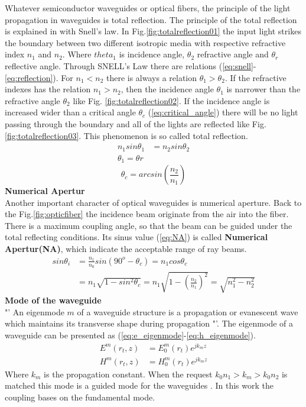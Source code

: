 Whatever semiconductor waveguides or optical fibers, the principle of the light propagation in waveguides is total reflection. The principle of the total reflection is explained in \cite{optical_waveguides_fibers} with Snell's law. In Fig.\ref{fig:totalreflection01} the input light strikes the boundary between two different isotropic media with respective refractive index $n_{1}$ and $n_{2}$. Where $theta_{1}$ is incidence angle, $\theta_{2}$ refractive angle and $\theta_{r}$ reflective angle. Through SNELL's Law there are relations (\ref{eq:snell}-\ref{eq:reflection}).  For $n_{1}<n_{2}$ there is  always a relation $\theta_{1}>\theta_{2}$.  If the refractive indexes has the relation $n_{1}>n_{2}$, then the incidence angle $\theta_{1}$ is narrower than the refractive angle $\theta_{2}$ like Fig. \ref{fig:totalreflection02}. If the incidence angle is increased wider than a critical angle $\theta_{c}$ (\ref{eq:critical_angle}) there will be no light passing through the boundary and all of the lights are reflected like Fig. \ref{fig:totalreflection03}. This phenomenon is so called total reflection.
\begin{align}
n_{1}sin\theta_{1}&=n_{2}sin\theta_{2}
\label{eq:snell}\\
\theta_{1}=\theta{r}
\label{eq:reflection}
\end{align}
\begin{equation}
\theta_{c}=arcsin(\frac{n_{2}}{n_{1}})
\label{eq:critical_angle}
\end{equation}
\textbf{ Numerical Apertur }\\
Another important character of optical waveguides is numerical aperture. Back to the Fig.\ref{fig:opticfiber} the incidence beam originate from the air into the fiber. There is a maximum coupling angle, so that the beam can be guided under the total reflecting conditions. Its sinus value (\ref{eq:NA}) is called \textbf{Numerical Apertur(NA)}, which indicate the acceptable range of ray beams.
\begin{align}
sin\theta_{i}&=\frac{n_{1}}{n_{0}}sin(90^{o}-\theta_{c})=n_{1}cos\theta_{c} \nonumber\\
&=n_{1}\sqrt{1-sin^{2}\theta_{c}}=n_{1}\sqrt{1-\left(\frac{n_{2}}{n_{1}}\right)^2}=\sqrt{n^2_{1}-n^2_{2}}
\label{eq:NA}
\end{align}
\textbf{Mode of the waveguide}\\
"' An eigenmode $m$ of a waveguide structure is a propagation or evanescent wave which maintains its transverse shape during propagation "'\cite{integrated_optics}. The eigenmode of a waveguide can be presented as (\ref{eq:e_eigenmode}-\ref{eq:h_eigenmode}). 
\begin{align}
E^{m}(r_{t},z)&=E^{m}_{0}(r_{t})e^{jk_{m}z}
\label{eq:e_eigenmode}\\
H^{m}(r_{t},z)&=H^{m}_{0}(r_{t})e^{jk_{m}z}
\label{eq:h_eigenmode}
\end{align}
Where $k_{m}$ is the propagation constant. When the request  $k_{0}n_{1}>k_{m}>k_{0}n_{2}$ is matched this mode is a guided mode for the waveguides \cite{script_FT_TET}. In this work the coupling bases on the fundamental mode.
